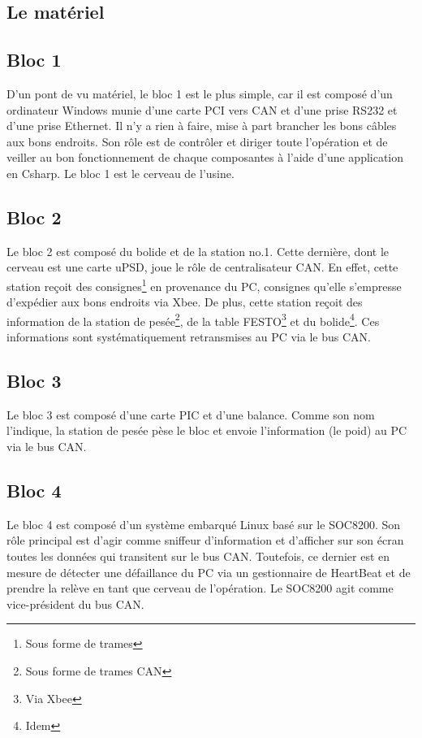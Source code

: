\documentclass[10pt,a4paper,final]{article}
\begin{document}
\begin{spacing}{1.5}


\pagebreak

\section{Le matériel}
\subsection{Bloc 1}
D'un pont de vu matériel, le bloc 1 est le plus simple, car il est composé d'un ordinateur Windows munie d'une carte PCI vers CAN et d'une prise RS232 et d'une prise Ethernet. Il n'y a rien à faire, mise à part brancher les bons câbles aux bons endroits. Son rôle est de contrôler et diriger toute l'opération et de veiller au bon fonctionnement de chaque composantes à l'aide d'une application en Csharp. Le bloc 1 est le cerveau de l'usine.

\subsection{Bloc 2}
Le bloc 2 est composé du bolide et de la station no.1. Cette dernière, dont le cerveau est une carte uPSD, joue le rôle de centralisateur CAN. En effet, cette station reçoit des consignes\footnote{Sous forme de trames} en provenance du PC, consignes qu'elle s'empresse d'expédier aux bons endroits via Xbee. De plus, cette station reçoit des information de la station de pesée\footnote{Sous forme de trames CAN}, de la table FESTO\footnote{Via Xbee} et du bolide\footnote{Idem}. Ces informations sont systématiquement retransmises au PC via le bus CAN.

\subsection{Bloc 3}
Le bloc 3 est composé d'une carte PIC et d'une balance. Comme son nom l'indique, la station de pesée pèse le bloc et envoie l'information (le poid) au PC via le bus CAN.

\subsection{Bloc 4}
Le bloc 4 est composé d'un système embarqué Linux basé sur le SOC8200. Son rôle principal est d'agir comme sniffeur d'information et d'afficher sur son écran toutes les données qui transitent sur le bus CAN. Toutefois, ce dernier est en mesure de détecter une défaillance du PC via un gestionnaire de HeartBeat et de prendre la relève en tant que cerveau de l'opération. Le SOC8200 agit comme vice-président du bus CAN.


\end{spacing}
\end{document}

